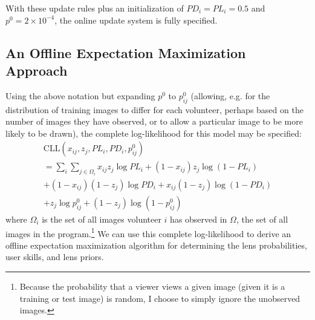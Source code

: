 \documentclass[useAMS,usenatbib,a4paper]{mn2e}
\begin{document}
With these update rules plus an initialization of $PD_{i} = PL_{i} = 0.5$ and
$p^{0} = 2 \times 10^{-4}$, the online update system is fully specified.


\subsection{An Offline Expectation Maximization Approach}
\label{sec:formalism:em}
Using the above notation but expanding $p^{0}$ to $p_{ij}^{0}$ (allowing, e.g. for
the distribution of training images to differ for each volunteer, perhaps based on
the number of images they have observed, or to allow a particular image to be
more likely to be drawn), the complete log-likelihood for this model may be
specified:
\begin{multline}
  \mathrm{CLL}(x_{ij}, z_{j}, PL_{i}, PD_{i}, p_{ij}^{0}) \\ = \sum_{i} \sum_{j \in \Omega_i} x_{ij} z_{j} \log PL_{i} +
      (1 - x_{ij}) z_j \log (1 -
      PL_{i}) \\ + (1 - x_{ij}) (1 - z_j) \log PD_{i} + x_{ij} (1 - z_j) \log (1 - PD_{i}) \\ + z_j \log p_{ij}^{0} +
      (1 - z_j ) \log(1 - p_{ij}^{0})
\end{multline}
where $\Omega_i$ is the set of all images volunteer $i$ has observed in $\Omega$,
the set of all images in the program.\footnote{Because the probability that a
  viewer views a given image (given it is a training or test image) is random,
I choose to simply ignore the unobserved images.} We can use this complete
log-likelihood to derive an offline expectation maximization algorithm for
determining the lens probabilities, user skills, and lens priors.

\end{document}
